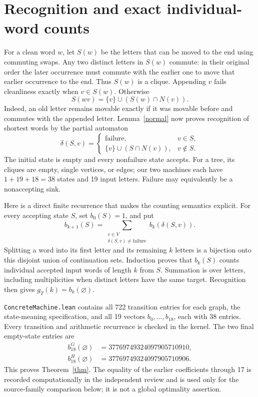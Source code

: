 \documentclass[11pt]{article}
\begin{document}
\section{Recognition and exact individual-word counts}
For a clean word \(w\), let \(S(w)\) be the letters that can be moved to the end using commuting swaps. Any two distinct letters in \(S(w)\) commute: in their original order the later occurrence must commute with the earlier one to move that earlier occurrence to the end. Thus \(S(w)\) is a clique.
Appending \(v\) fails cleanliness exactly when \(v\in S(w)\). Otherwise
\[
 S(wv)=\{v\}\cup(S(w)\cap N(v)).
\]
Indeed, an old letter remains movable exactly if it was movable before and commutes with the appended letter. Lemma~\ref{normal} now proves recognition of shortest words by the partial automaton
\[
 \delta(S,v)=\begin{cases}\text{failure},&v\in S,\\
 \{v\}\cup(S\cap N(v)),&v\notin S.
 \end{cases}
\]
The initial state is empty and every nonfailure state accepts. For a tree, its cliques are empty, single vertices, or edges; our two machines each have \(1+19+18=38\) states and 19 input letters. Failure may equivalently be a nonaccepting sink.

Here is a direct finite recurrence that makes the counting semantics explicit. For every accepting state \(S\), set \(b_0(S)=1\), and put
\[
 b_{k+1}(S)=\sum_{\substack{v\in V\\\delta(S,v)\ne\mathrm{failure}}}
 b_k(\delta(S,v)).
\]
Splitting a word into its first letter and its remaining \(k\) letters is a bijection onto this disjoint union of continuation sets. Induction proves that \(b_k(S)\) counts individual accepted input words of length \(k\) from \(S\). Summation is over letters, including multiplicities when distinct letters have the same target. Recognition then gives \(g_T(k)=b_k(\varnothing)\).

\texttt{ConcreteMachine.lean} contains all 722 transition entries for each graph, the state-meaning specification, and all 19 vectors \(b_0,\ldots,b_{18}\), each with 38 entries. Every transition and arithmetic recurrence is checked in the kernel. The two final empty-state entries are
\[
\begin{split}
 b_{18}^G(\varnothing)&=37769749324097905710910,\\
 b_{18}^H(\varnothing)&=37769749324097905710906.
\end{split}
\]
This proves Theorem~\ref{thm}. The equality of the earlier coefficients through 17 is recorded computationally in the independent review and is used only for the source-family comparison below; it is not a global optimality assertion.
\end{document}
